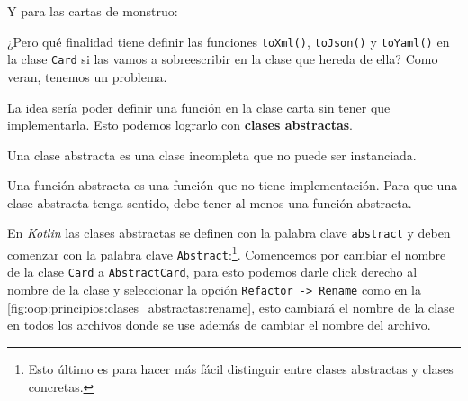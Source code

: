   Y para las cartas de monstruo:


  ¿Pero qué finalidad tiene definir las funciones \texttt{toXml()}, \texttt{toJson()} y 
  \texttt{toYaml()} en la clase \texttt{Card} si las vamos a sobreescribir en la clase que hereda
  de ella?
  Como veran, tenemos un problema.

  La idea sería poder definir una función en la clase carta sin tener que implementarla.
  Esto podemos lograrlo con \textbf{clases abstractas}.

  \begin{defaultbox}
    Una clase abstracta es una clase incompleta que no puede ser instanciada.

    Una función abstracta es una función que no tiene implementación.
    Para que una clase abstracta tenga sentido, debe tener al menos una función abstracta.
  \end{defaultbox}

  En \textit{Kotlin} las clases abstractas se definen con la palabra clave \texttt{abstract} y deben
  comenzar con la palabra clave \texttt{Abstract}:\footnote{
    Esto último es para hacer más fácil distinguir entre clases abstractas y clases concretas.
  }.
  Comencemos por cambiar el nombre de la clase \texttt{Card} a \texttt{AbstractCard}, para esto 
  podemos darle click derecho al nombre de la clase y seleccionar la opción \texttt{Refactor ->
  Rename} como en la \cref{fig:oop:principios:clases_abstractas:rename}, esto cambiará el nombre de
  la clase en todos los archivos donde se use además de cambiar el nombre del archivo.

